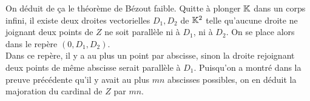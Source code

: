 \documentclass{article}
\begin{document}
On déduit de ça le théorème de Bézout faible. Quitte à plonger $\mathbb{K}$ dans un corps infini, il existe deux droites vectorielles $D_1, D_2$ de $\mathbb{K}^2$ telle qu'aucune droite ne joignant deux points de $Z$ ne soit parallèle ni à $D_1$, ni à $D_2$. On se place alors dans le repère $(0, D_1, D_2)$.\\
Dans ce repère, il y a au plus un point par abscisse, sinon la droite rejoignant deux points de même abscisse serait parallèle à $D_1$. Puisqu'on a montré dans la preuve précédente qu'il y avait au plus $mn$ abscisses possibles, on en déduit la majoration du cardinal de $Z$ par $mn$.
\end{document}
